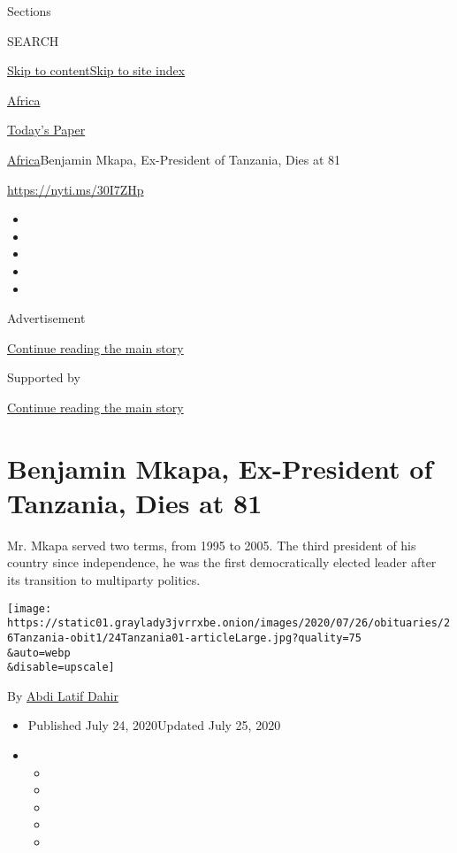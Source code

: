 Sections

SEARCH

\protect\hyperlink{site-content}{Skip to
content}\protect\hyperlink{site-index}{Skip to site index}

\href{https://www.nytimes3xbfgragh.onion/section/world/africa}{Africa}

\href{https://myaccount.nytimes3xbfgragh.onion/auth/login?response_type=cookie\&client_id=vi}{}

\href{https://www.nytimes3xbfgragh.onion/section/todayspaper}{Today's
Paper}

\href{/section/world/africa}{Africa}\textbar{}Benjamin Mkapa,
Ex-President of Tanzania, Dies at 81

\url{https://nyti.ms/30I7ZHp}

\begin{itemize}
\item
\item
\item
\item
\item
\end{itemize}

Advertisement

\protect\hyperlink{after-top}{Continue reading the main story}

Supported by

\protect\hyperlink{after-sponsor}{Continue reading the main story}

\hypertarget{benjamin-mkapa-ex-president-of-tanzania-dies-at-81}{%
\section{Benjamin Mkapa, Ex-President of Tanzania, Dies at
81}\label{benjamin-mkapa-ex-president-of-tanzania-dies-at-81}}

Mr. Mkapa served two terms, from 1995 to 2005. The third president of
his country since independence, he was the first democratically elected
leader after its transition to multiparty politics.

\texttt{[image: https://static01.graylady3jvrrxbe.onion/images/2020/07/26/obituaries/26Tanzania-obit1/24Tanzania01-articleLarge.jpg?quality=75\\\&auto=webp\\\&disable=upscale]}

By \href{https://www.nytimes3xbfgragh.onion/by/abdi-latif-dahir}{Abdi
Latif Dahir}

\begin{itemize}
\item
  Published July 24, 2020Updated July 25, 2020
\item
  \begin{itemize}
  \item
  \item
  \item
  \item
  \item
  \end{itemize}
\end{itemize}

